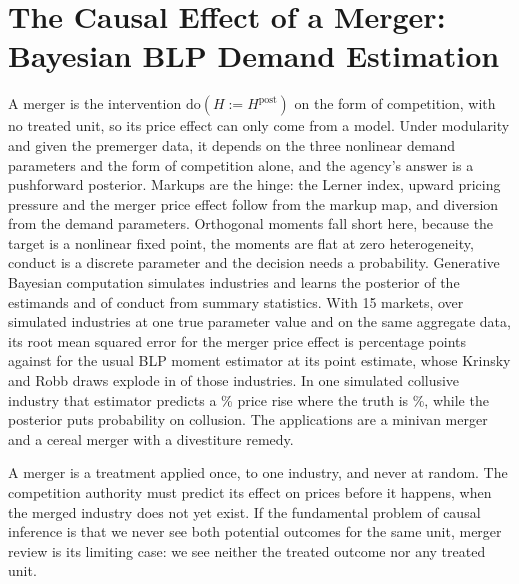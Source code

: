 \chapter[The Causal Effect of a Merger]{The Causal Effect of a Merger: Bayesian BLP Demand Estimation}\label{ch:blp}

\providecommand{\E}{\mathbb{E}}
\providecommand{\diag}{\mathrm{diag}}
\providecommand{\cH}{\mathcal{H}}
\providecommand{\data}{\mathcal{D}}




\begin{tcolorbox}[colback=gray!6,colframe=gray!50,title=In brief,fonttitle=\normalfont\itshape,coltitle=black,colbacktitle=gray!15,boxrule=0.4pt,arc=1pt]
A merger is the intervention $\mathrm{do}(H := H^{\mathrm{post}})$ on the form of competition, with no treated unit, so its price effect can only come from a model. Under modularity and given the premerger data, it depends on the three nonlinear demand parameters and the form of competition alone, and the agency's answer is a pushforward posterior. Markups are the hinge: the Lerner index, upward pricing pressure and the merger price effect follow from the markup map, and diversion from the demand parameters. Orthogonal moments fall short here, because the target is a nonlinear fixed point, the moments are flat at zero heterogeneity, conduct is a discrete parameter and the decision needs a probability. Generative Bayesian computation simulates industries and learns the posterior of the estimands and of conduct from summary statistics. With 15 markets, over \nummcnxv{} simulated industries at one true parameter value and on the same aggregate data, its root mean squared error for the merger price effect is \nummcdprmsenmxv{} percentage points against \nummcdprmseplugxv{} for the usual BLP moment estimator at its point estimate, whose Krinsky and Robb draws explode in \nummcexplxv{} of those industries. In one simulated collusive industry that estimator predicts a \nummscollusiongmm\% price rise where the truth is \nummscollusiontrue\%, while the posterior puts probability \nummscollusionpc{} on collusion. The applications are a minivan merger and a cereal merger with a divestiture remedy.
\end{tcolorbox}

A merger is a treatment applied once, to one industry, and never at random. The competition authority must predict its effect on prices before it happens, when the merged industry does not yet exist. If the fundamental problem of causal inference is that we never see both potential outcomes for the same unit, merger review is its limiting case: we see neither the treated outcome nor any treated unit.

